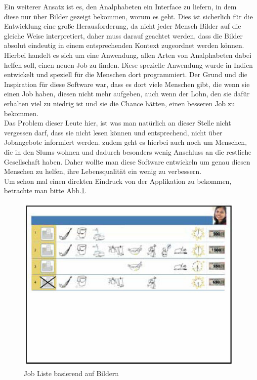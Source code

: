 Ein weiterer Ansatz ist es, den Analphabeten ein Interface zu liefern, in dem diese nur über Bilder gezeigt bekommen, worum es geht. Dies ist sicherlich für die Entwicklung eine große Herausforderung, da nicht jeder Mensch Bilder auf die gleiche Weise interpretiert, daher muss darauf geachtet werden, dass die Bilder absolut eindeutig in einem entsprechenden Kontext zugeordnet werden können.\\
Hierbei handelt es sich um eine Anwendung, allen Arten von Analphabeten dabei helfen soll, einen neuen Job zu finden. Diese spezielle Anwendung wurde in Indien entwickelt und speziell für die Menschen dort programmiert. Der Grund und die Inspiration für diese Software war, dass es dort viele Menschen gibt, die wenn sie einen Job haben, diesen nicht mehr aufgeben, auch wenn der Lohn, den sie dafür erhalten viel zu niedrig ist und sie die Chance hätten, einen besseren Job zu bekommen.\\
Das Problem dieser Leute hier, ist was man natürlich an dieser Stelle nicht vergessen darf, dass sie nicht lesen können und entsprechend, nicht über Jobangebote informiert werden. zudem geht es hierbei auch noch um Menschen, die in den Slums wohnen und dadurch besonders wenig Anschluss an die restliche Gesellschaft haben. Daher wollte man diese Software entwickeln um genau diesen Menschen zu helfen, ihre Lebensqualität ein wenig zu verbessern.\\
Um schon mal einen direkten Eindruck von der Applikation zu bekommen, betrachte man bitte Abb.\ref{fig:joblist}.


\begin{figure}[h]
	\centering
		\includegraphics{Daten/job_list.PNG}
	\caption{Job Liste basierend auf Bildern}
	\label{fig:joblist}
\end{figure}

